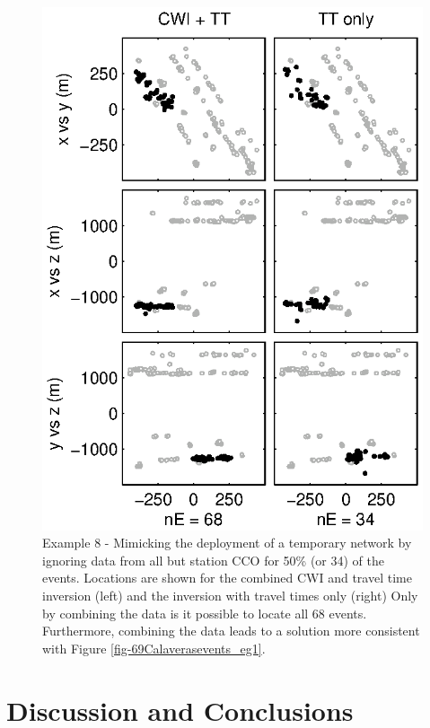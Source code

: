 \documentclass[extra, onecolumn, doublespacing]{gji}
\begin{document}
\begin{figure}
\includegraphics{diags/CalaverasLoc6_hypoDD_SVD.eps}
\caption{Example 8 - Mimicking the deployment of a temporary network
by ignoring data from all but station CCO for 50\% (or 34) of the
events. Locations are shown for the combined CWI and travel time
inversion (left) and the inversion with travel times only (right)
Only by combining the data is it possible to locate all 68 events.
Furthermore, combining the data leads to a solution more consistent
with Figure \ref{fig-69Calaverasevents_eg1}. }
\label{fig-68Calaverasevents_ttsubsetandcoda1}
\end{figure}



\section{Discussion and Conclusions}
\end{document}
